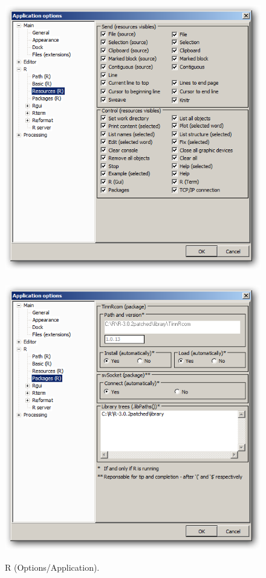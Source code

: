 \begin{figure}[h!]
  \includegraphics[scale=0.35]{./res/app_r_resources.png}~~
  \includegraphics[scale=0.35]{./res/app_r_packages.png}\\
  \caption{R (Options/Application).}
  \label{fig:app_r_a}
\end{figure}


